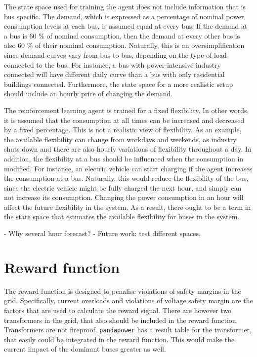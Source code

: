 \documentclass[class=book, crop=false]{standalone}
\begin{document}
The state space used for training the agent does not include information that is bus specific. The demand, which is expressed as a percentage of nominal power consumption levels at each bus, is assumed equal at every bus. If the demand at a bus is 60 \% of nominal consumption, then the demand at every other bus is also 60 \% of their nominal consumption. Naturally, this is an oversimplification since demand curves vary from bus to bus, depending on the type of load connected to the bus. For instance, a bus with power-intensive industry connected will have different daily curve than a bus with only residential buildings connected. Furthermore, the state space for a more realistic setup should include an hourly price of changing the demand.

The reinforcement learning agent is trained for a fixed flexibility. In other words, it is assumed that the consumption at all times can be increased and decreased by a fixed percentage. This is not a realistic view of flexibility. As an example, the available flexibility can change from workdays and weekends, as industry shuts down and there are also hourly variations of flexibility throughout a day. In addition, the flexibility at a bus should be influenced when the consumption in modified. For instance, an electric vehicle can start charging if the agent increases the consumption at a bus. Naturally, this would reduce the flexibility of the bus, since the electric vehicle might be fully charged the next hour, and simply can not increase its consumption. Changing the power consumption in an hour will affect the future flexibility in the system. As a result, there ought to be a term in the state space that estimates the available flexibility for buses in the system. 

- Why several hour forecast?
- Future work: test different spaces, 


\section{Reward function}
The reward function is designed to penalise violations of safety margins in the grid. Specifically, current overloads and violations of voltage safety margin are the factors that are used to calculate the reward signal. There are however two transformers in the grid, that also should be included in the reward function. Transformers are not fireproof. \texttt{pandapower} has a result table for the transformer, that easily could be integrated in the reward function. This would make the current impact of the dominant buses greater as well. 
\end{document}
